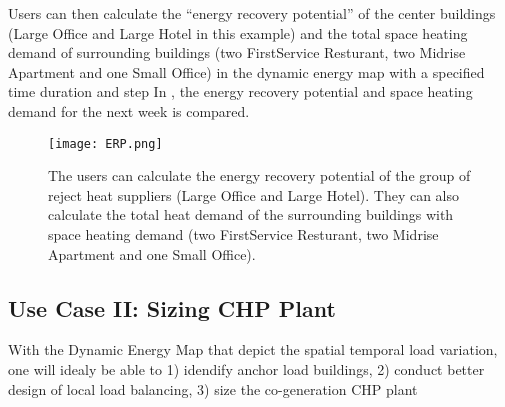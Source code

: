 Users can then calculate the ``energy recovery potential'' of the
center buildings (Large Office and Large Hotel in this example) and
the total space heating demand of surrounding buildings (two
FirstService Resturant, two Midrise Apartment and one Small Office) in
the dynamic energy map with a specified time duration and step In
, the energy recovery potential and space heating demand
for the next week is compared.

\begin{figure}[h!]
  \centering
  \texttt{[image: ERP.png]}
  \caption[Calculate Energy Recovery Potential]{The users can
    calculate the energy recovery potential of the group of reject
    heat suppliers (Large Office and Large Hotel). They can also
    calculate the total heat demand of the surrounding buildings with
    space heating demand (two FirstService Resturant, two Midrise
    Apartment and one Small Office).}
  \label{fig:ERP}
\end{figure}

\subsection{Use Case II: Sizing CHP Plant}
With the Dynamic Energy Map that depict the spatial temporal load
variation, one will idealy be able to 1) idendify anchor load
buildings, 2) conduct better design of local load balancing, 3) size
the co-generation CHP plant

